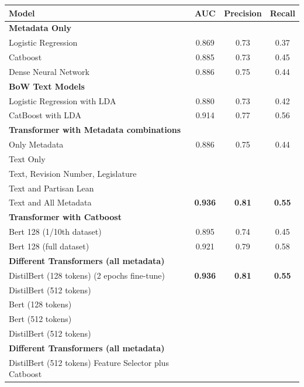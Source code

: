 \documentclass[11pt]{article}
\begin{document}
\begin{tabular}{ l  c  c  c}
 Model & AUC & Precision & Recall  \\
 \hline
 \textbf{Metadata Only} & & & \\
\hspace{3mm}Logistic Regression & 0.869 & 0.73 & 0.37 \\
\hspace{3mm}Catboost  & 0.885 & 0.73 & 0.45 \\
\hspace{3mm} Dense Neural Network & 0.886 &  0.75 & 0.44 \\
\hline
\textbf{BoW Text Models} & & & \\
\hspace{3mm}Logistic Regression with LDA & 0.880 & 0.73 & 0.42 \\
\hspace{3mm}CatBoost with LDA & 0.914 & 0.77 & 0.56 \\ 
\hline
\textbf{Transformer with Metadata combinations} & & & \\
\hspace{3mm}Only Metadata & 0.886 &  0.75 & 0.44 \\
\hspace{3mm}Text Only & & & \\
\hspace{3mm}Text, Revision Number, Legislature & & & \\
\hspace{3mm}Text and Partisan Lean & & & \\
\hspace{3mm}Text and All Metadata & \textbf{ 0.936 }& \textbf{0.81} & \textbf{0.55} \\
\textbf{Transformer with Catboost} & & & \\
\hspace{3mm}Bert 128 (1/10th dataset) & 0.895 & 0.74 & 0.45 \\
\hspace{3mm}Bert 128 (full dataset) & 0.921 & 0.79 & 0.58 \\

\hline
\textbf{Different Transformers (all metadata)} & & & \\
\hspace{3mm}DistilBert (128 tokens) (2 epochs fine-tune) & \textbf{ 0.936 }& \textbf{0.81} & \textbf{0.55} \\
\hspace{3mm}DistilBert (512 tokens)  &  & & \\
\hspace{3mm}Bert (128 tokens) &  & & \\
\hspace{3mm}Bert (512 tokens)  &  & & \\
\hspace{3mm}DistilBert (512 tokens) &  & & \\
\hline
\textbf{Different Transformers (all metadata)} & & & \\
\hspace{3mm}DistilBert (512 tokens) Feature Selector plus Catboost&  & & \\

\end{tabular}
\end{document}
